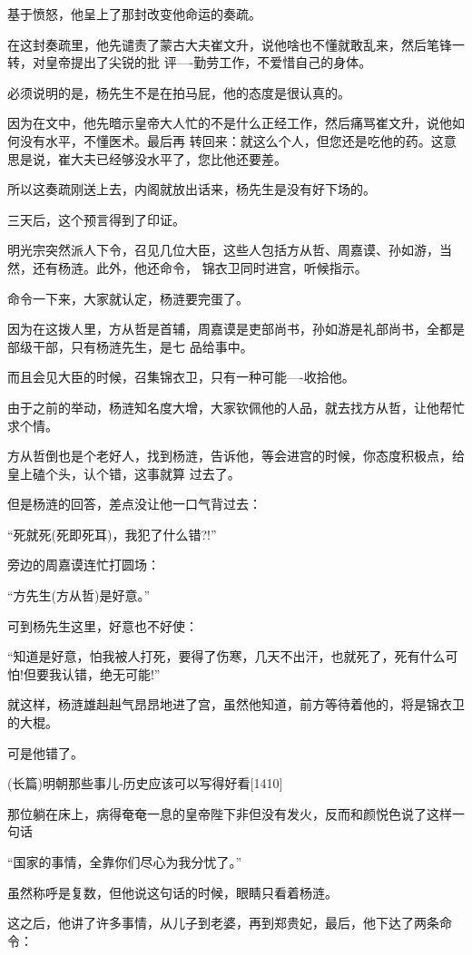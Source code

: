 \documentclass[11pt,a4paper,onecolumn]{article}
\begin{document}
基于愤怒，他呈上了那封改变他命运的奏疏。

在这封奏疏里，他先谴责了蒙古大夫崔文升，说他啥也不懂就敢乱来，然后笔锋一转，对皇帝提出了尖锐的批
评----勤劳工作，不爱惜自己的身体。

必须说明的是，杨先生不是在拍马屁，他的态度是很认真的。

因为在文中，他先暗示皇帝大人忙的不是什么正经工作，然后痛骂崔文升，说他如何没有水平，不懂医术。最后再
转回来：就这么个人，但您还是吃他的药。这意思是说，崔大夫已经够没水平了，您比他还要差。

所以这奏疏刚送上去，内阁就放出话来，杨先生是没有好下场的。

三天后，这个预言得到了印证。

明光宗突然派人下令，召见几位大臣，这些人包括方从哲、周嘉谟、孙如游，当然，还有杨涟。此外，他还命令，
锦衣卫同时进宫，听候指示。

命令一下来，大家就认定，杨涟要完蛋了。

因为在这拨人里，方从哲是首辅，周嘉谟是吏部尚书，孙如游是礼部尚书，全都是部级干部，只有杨涟先生，是七
品给事中。

而且会见大臣的时候，召集锦衣卫，只有一种可能----收拾他。

由于之前的举动，杨涟知名度大增，大家钦佩他的人品，就去找方从哲，让他帮忙求个情。

方从哲倒也是个老好人，找到杨涟，告诉他，等会进宫的时候，你态度积极点，给皇上磕个头，认个错，这事就算
过去了。

但是杨涟的回答，差点没让他一口气背过去：

``死就死(死即死耳)，我犯了什么错?!''

旁边的周嘉谟连忙打圆场：

``方先生(方从哲)是好意。''

可到杨先生这里，好意也不好使：

``知道是好意，怕我被人打死，要得了伤寒，几天不出汗，也就死了，死有什么可怕!但要我认错，绝无可能!''

就这样，杨涟雄赳赳气昂昂地进了宫，虽然他知道，前方等待着他的，将是锦衣卫的大棍。

可是他错了。

(长篇)明朝那些事儿-历史应该可以写得好看$[$1410$]$

那位躺在床上，病得奄奄一息的皇帝陛下非但没有发火，反而和颜悦色说了这样一句话

``国家的事情，全靠你们尽心为我分忧了。''

虽然称呼是复数，但他说这句话的时候，眼睛只看着杨涟。

这之后，他讲了许多事情，从儿子到老婆，再到郑贵妃，最后，他下达了两条命令：
\end{document}
